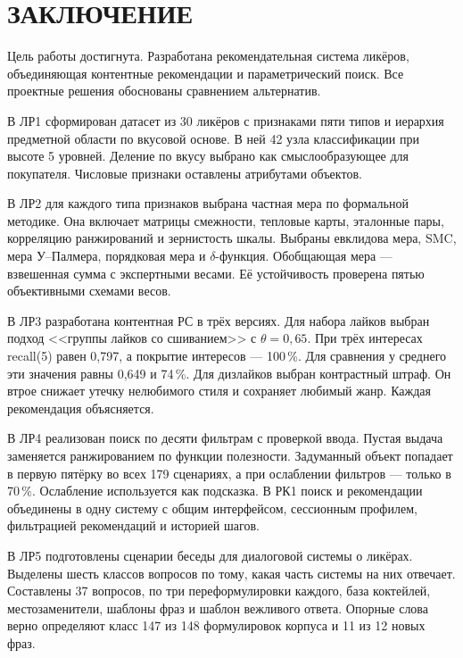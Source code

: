 \chapter*{ЗАКЛЮЧЕНИЕ}

Цель работы достигнута. Разработана рекомендательная система ликёров, объединяющая контентные рекомендации и параметрический поиск. Все проектные решения обоснованы сравнением альтернатив.

В ЛР1 сформирован датасет из 30 ликёров с признаками пяти типов и иерархия предметной области по вкусовой основе. В ней 42 узла классификации при высоте 5 уровней. Деление по вкусу выбрано как смыслообразующее для покупателя. Числовые признаки оставлены атрибутами объектов.

В ЛР2 для каждого типа признаков выбрана частная мера по формальной методике. Она включает матрицы смежности, тепловые карты, эталонные пары, корреляцию ранжирований и зернистость шкалы. Выбраны евклидова мера, SMC, мера У--Палмера, порядковая мера и $\delta$-функция. Обобщающая мера --- взвешенная сумма с экспертными весами. Её устойчивость проверена пятью объективными схемами весов.

В ЛР3 разработана контентная РС в трёх версиях. Для набора лайков выбран подход <<группы лайков со сшиванием>> с $\theta = 0{,}65$. При трёх интересах recall(5) равен 0,797, а покрытие интересов --- 100\,\%. Для сравнения у среднего эти значения равны 0,649 и 74\,\%. Для дизлайков выбран контрастный штраф. Он втрое снижает утечку нелюбимого стиля и сохраняет любимый жанр. Каждая рекомендация объясняется.

В ЛР4 реализован поиск по десяти фильтрам с проверкой ввода. Пустая выдача заменяется ранжированием по функции полезности. Задуманный объект попадает в первую пятёрку во всех 179 сценариях, а при ослаблении фильтров --- только в 70\,\%. Ослабление используется как подсказка. В РК1 поиск и рекомендации объединены в одну систему с общим интерфейсом, сессионным профилем, фильтрацией рекомендаций и историей шагов.

В ЛР5 подготовлены сценарии беседы для диалоговой системы о ликёрах. Выделены шесть классов вопросов по тому, какая часть системы на них отвечает. Составлены 37 вопросов, по три переформулировки каждого, база коктейлей, местозаменители, шаблоны фраз и шаблон вежливого ответа. Опорные слова верно определяют класс 147 из 148 формулировок корпуса и 11 из 12 новых фраз.
